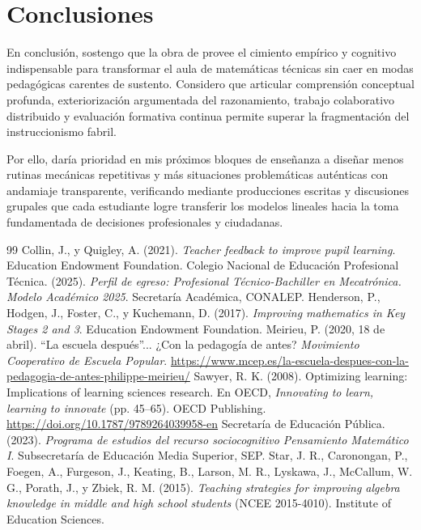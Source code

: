 \documentclass[spanish,letterpaper,oneside]{article}
\begin{document}
\clearpage
\section{Conclusiones}
En conclusión, sostengo que la obra de \citet{sawyer2008optimizing} provee el cimiento empírico y cognitivo indispensable para transformar el aula de matemáticas técnicas sin caer en modas pedagógicas carentes de sustento. Considero que articular comprensión conceptual profunda, exteriorización argumentada del razonamiento, trabajo colaborativo distribuido y evaluación formativa continua permite superar la fragmentación del instruccionismo fabril.

Por ello, daría prioridad en mis próximos bloques de enseñanza a diseñar menos rutinas mecánicas repetitivas y más situaciones problemáticas auténticas con andamiaje transparente, verificando mediante producciones escritas y discusiones grupales que cada estudiante logre transferir los modelos lineales hacia la toma fundamentada de decisiones profesionales y ciudadanas.

\clearpage
\begin{thebibliography}{99}
 Collin, J., y Quigley, A. (2021). \textit{Teacher feedback to improve pupil learning}. Education Endowment Foundation.
 Colegio Nacional de Educación Profesional Técnica. (2025). \textit{Perfil de egreso: Profesional Técnico-Bachiller en Mecatrónica. Modelo Académico 2025}. Secretaría Académica, CONALEP.
 Henderson, P., Hodgen, J., Foster, C., y Kuchemann, D. (2017). \textit{Improving mathematics in Key Stages 2 and 3}. Education Endowment Foundation.
 Meirieu, P. (2020, 18 de abril). ``La escuela después''... ¿Con la pedagogía de antes? \textit{Movimiento Cooperativo de Escuela Popular}. \url{https://www.mcep.es/la-escuela-despues-con-la-pedagogia-de-antes-philippe-meirieu/}
 Sawyer, R. K. (2008). Optimizing learning: Implications of learning sciences research. En OECD, \textit{Innovating to learn, learning to innovate} (pp. 45--65). OECD Publishing. \url{https://doi.org/10.1787/9789264039958-en}
 Secretaría de Educación Pública. (2023). \textit{Programa de estudios del recurso sociocognitivo Pensamiento Matemático I}. Subsecretaría de Educación Media Superior, SEP.
 Star, J. R., Caronongan, P., Foegen, A., Furgeson, J., Keating, B., Larson, M. R., Lyskawa, J., McCallum, W. G., Porath, J., y Zbiek, R. M. (2015). \textit{Teaching strategies for improving algebra knowledge in middle and high school students} (NCEE 2015-4010). Institute of Education Sciences.
\end{thebibliography}
\end{document}
